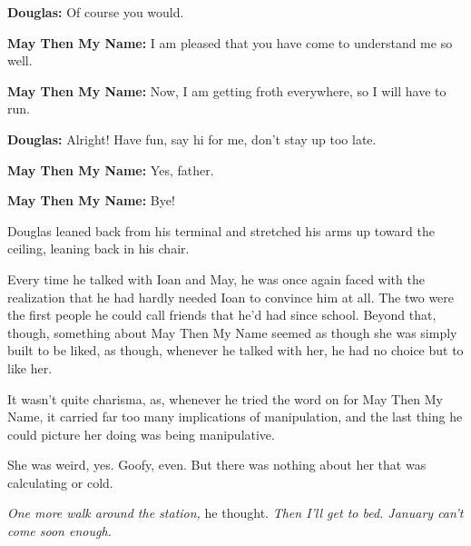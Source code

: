 \textbf{Douglas:} Of course you would.

\textbf{May Then My Name:} I am pleased that you have come to understand me so well.

\textbf{May Then My Name:} Now, I am getting froth everywhere, so I will have to run.

\textbf{Douglas:} Alright! Have fun, say hi for me, don't stay up too late.

\textbf{May Then My Name:} Yes, father.

\textbf{May Then My Name:} Bye!

Douglas leaned back from his terminal and stretched his arms up toward the ceiling, leaning back in his chair.

Every time he talked with Ioan and May, he was once again faced with the realization that he had hardly needed Ioan to convince him at all. The two were the first people he could call friends that he'd had since school. Beyond that, though, something about May Then My Name seemed as though she was simply built to be liked, as though, whenever he talked with her, he had no choice but to like her.

It wasn't quite charisma, as, whenever he tried the word on for May Then My Name, it carried far too many implications of manipulation, and the last thing he could picture her doing was being manipulative.

She was weird, yes. Goofy, even. But there was nothing about her that was calculating or cold.

\emph{One more walk around the station,} he thought. \emph{Then I'll get to bed. January can't come soon enough.}
